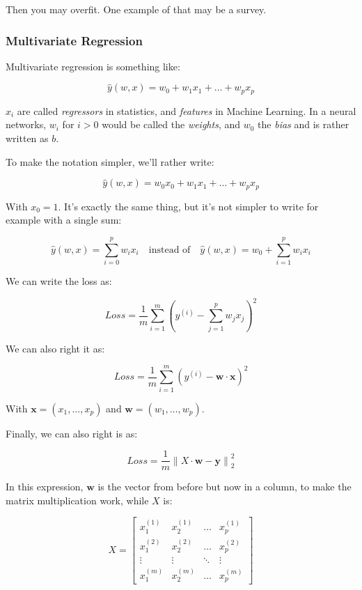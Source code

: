 \documentclass{article}
\theoremstyle{problemstyle}
\begin{document}
Then you may overfit. One example of that may be a survey. 

\subsubsection{Multivariate Regression}

Multivariate regression is something like:

\[
  \hat{y} (w,x) = w_0 + w_1x_1 + \dots + w_p x_p
\]

$x_i$ are called \emph{regressors} in statistics, and \emph{features} in Machine Learning. In a neural networks, $w_i$ for $i > 0$ would be called the \emph{weights}, and $w_0$ the \emph{bias} and is rather written as $b$.

To make the notation simpler, we'll rather write:

\[
  \hat{y} (w,x) = w_0x_0 + w_1x_1 + \dots + w_p x_p
\]

With $x_0 =1$. It's exactly the same thing, but it's not simpler to write for example with a single sum:

\[
  \hat{y} (w,x) = \sum\limits_{i=0}^{p} w_i x_i \quad \text{instead of}  \quad \hat{y} (w,x) = w_0 +  \sum\limits_{i=1}^{p} w_i x_i
\]

We can write the loss as:

\[
  Loss = \frac{1}{m} \sum\limits_{i=1}^{m} \left( y^{(i)} - \sum\limits_{j=1}^{p} w_j x_j \right) ^{2}
\]

We can also right it as:

\[
  Loss = \frac{1}{m} \sum\limits_{i=1}^{m} \left( y^{(i)} - \textbf{w}\cdot \textbf{x} \right) ^{2}
\]

With $\textbf{x} = (x_1, \dots , x_p)$ and $\textbf{w} = (w_1, \dots , w_p)$.

Finally, we can also right is as:

\[
  Loss = \frac{1}{m} \left\lVert X \cdot \textbf{w} - \textbf{y} \right\rVert_2 ^{2}
\]

In this expression, $\textbf{w}$ is the vector from before but now in a column, to make the matrix multiplication work, while $X$ is:

\[
  X =
  \begin{bmatrix}
    x_1^{(1)} & x_2^{(1)} & \dots & x_p^{(1)} \\
    x_1^{(2)} & x_2^{(2)} & \dots & x_p^{(2)} \\
    \vdots    & \vdots    & \ddots& \vdots    \\
    x_1^{(m)} & x_2^{(m)} & \dots & x_p^{(m)}
  \end{bmatrix}
\]
\end{document}
